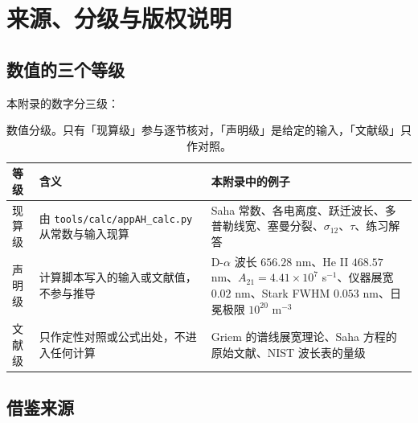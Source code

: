 \section{来源、分级与版权说明}
\label{sec:app-ah-source}

\begingroup\small
\subsection*{数值的三个等级}

本附录的数字分三级：

\begin{table}[htbp]
\centering
\small
\caption{数值分级。只有「现算级」参与逐节核对，「声明级」是给定的输入，「文献级」只作对照。}
\label{tab:app-ah-source}
\begin{tabular}{p{2.2cm}p{4.6cm}p{6.0cm}}
\toprule
等级 & 含义 & 本附录中的例子 \\
\midrule
现算级 & 由 \texttt{tools/\allowbreak{}calc/\allowbreak{}appAH\_calc.py} 从常数与输入现算 & Saha 常数、各电离度、跃迁波长、多普勒线宽、塞曼分裂、$\sigma_{12}$、$\tau$、练习解答 \\
声明级 & 计算脚本写入的输入或文献值，不参与推导 & D-$\alpha$ 波长 $656.28$ nm、He II $468.57$ nm、$A_{21}=4.41\times10^{7}$ s$^{-1}$、仪器展宽 $0.02$ nm、Stark FWHM $0.053$ nm、日冕极限 $10^{20}$ m$^{-3}$ \\
文献级 & 只作定性对照或公式出处，不进入任何计算 & Griem 的谱线展宽理论、Saha 方程的原始文献、NIST 波长表的量级 \\
\bottomrule
\end{tabular}

\end{table}

\subsection*{借鉴来源}


